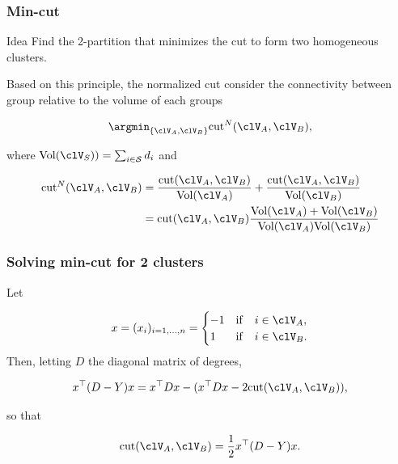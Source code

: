 \documentclass{beamer}\usepackage[]{graphicx}\usepackage[]{color}
\begin{document}
\begin{frame}
  \frametitle{Min-cut}
  
  \begin{block}{Idea}
    Find the 2-partition that minimizes the cut to form two homogeneous clusters.
  \end{block}

  Based on this principle, the normalized cut consider the connectivity between group relative to the volume of each groups

$$\argmin_{\{\clV_A, \clV_B\}} \mathrm{cut}^{N}(\clV_A, \clV_B),$$

where $\mathrm{Vol}(\clV_S)) = \sum_{i\in\mathcal{S}} d_i$ and

$$
\begin{aligned}
\mathrm{cut}^{N}(\clV_A, \clV_B) & = \frac{\mathrm{cut}(\clV_A, \clV_B)}{\mathrm{Vol}(\clV_A)} + \frac{\mathrm{cut}(\clV_A, \clV_B)}{\mathrm{Vol}(\clV_B)} \\
 & =  \mathrm{cut}(\clV_A, \clV_B)\frac{\mathrm{Vol}(\clV_A) + \mathrm{Vol}(\clV_B)}{\mathrm{Vol}(\clV_A)\mathrm{Vol}(\clV_B)} \\
\end{aligned}
$$

\end{frame}

\begin{frame}
  \frametitle{Solving min-cut for 2 clusters}
  
Let 

$$
x = (x_i)_{i=1,\dots,n} = 
\begin{cases}
-1 & \mathrm{if} \quad  i\in \clV_A, \\
 1 & \mathrm{if} \quad  i\in \clV_B. \\
\end{cases}
$$
Then, letting $D$ the diagonal matrix of degrees, 

$$
x^\top (D - Y) x = x^\top D x - ( x^\top D x - 2 \mathrm{cut} (\clV_A, \clV_B)),
$$

so that 

$$
\mathrm{cut} (\clV_A, \clV_B) = \frac12 x^\top (D - Y) x.
$$

\end{frame}
\end{document}
